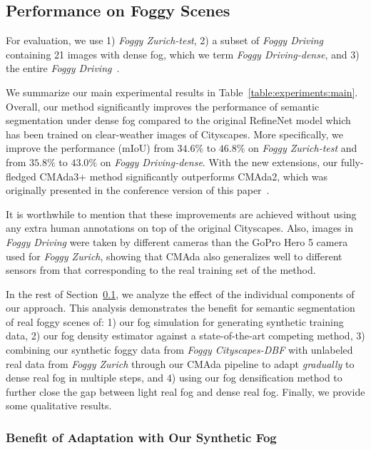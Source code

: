 \documentclass[twocolumn]{svjour3}          \smartqed  \usepackage{graphicx}
\begin{document}
\subsection{Performance on Foggy Scenes}
\label{sec:experiments:foggy}

For evaluation, we use 1) \emph{Foggy Zurich-test}, 2) a subset of \emph{Foggy Driving}~\cite{SFSU_synthetic} containing 21 images with dense fog, which we term \emph{Foggy Driving-dense}, and 3) the entire \emph{Foggy Driving}~\cite{SFSU_synthetic}.

We summarize our main experimental results in Table~\ref{table:experiments:main}. Overall, our method significantly improves the performance of semantic segmentation under dense fog compared to the original RefineNet model which has been trained on clear-weather images of Cityscapes. More specifically, we improve the performance (mIoU) from $34.6\%$ to $\mathbf{46.8\%}$ on \emph{Foggy Zurich-test} and from $35.8\%$ to $\mathbf{43.0\%}$ on \emph{Foggy Driving-dense}. With the new extensions, our fully-fledged CMAda3+ method significantly outperforms CMAda2, which was originally presented in the conference version of this paper~\cite{dense:SFSU:eccv18}.

It is worthwhile to mention that these improvements are achieved without using any extra human annotations on top of the original Cityscapes. Also, images in \emph{Foggy Driving} were taken by different cameras than the GoPro Hero 5 camera used for \emph{Foggy Zurich}, showing that CMAda also generalizes well to different sensors from that corresponding to the real training set of the method.

In the rest of Section~\ref{sec:experiments:foggy}, we analyze the effect of the individual components of our approach. This analysis demonstrates the benefit for semantic segmentation of real foggy scenes of: 1) our fog simulation for generating synthetic training data, 2) our fog density estimator against a state-of-the-art competing method, 3) combining our synthetic foggy data from \emph{Foggy Cityscapes-DBF} with unlabeled real data from \emph{Foggy Zurich} through our CMAda pipeline to adapt \emph{gradually} to dense real fog in multiple steps, and 4) using our fog densification method to further close the gap between light real fog and dense real fog. Finally, we provide some qualitative results.

\subsubsection{Benefit of Adaptation with Our Synthetic Fog}
\label{sec:experiments:synthetic}
\end{document}
